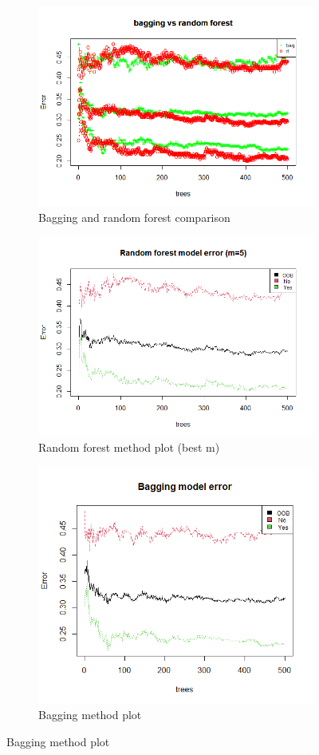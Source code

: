 \begin{figure}[h]
	\centering
	\begin{subfigure}{.6\textwidth}
		\centering
		\includegraphics[width=0.5\linewidth]{ImageFiles/Classification/vs_bagg_for_500_plot}
		\caption{Bagging and random forest comparison}
		\label{fig:vs_bagg_for_500_plot}
	\end{subfigure}
	\begin{subfigure}{.6\textwidth}
		\centering
		\includegraphics[width=0.5\linewidth]{ImageFiles/Classification/best_for_500_plot}
		\caption{Random forest method plot (best m)}
		\label{fig:best_for_500_plot}
	\end{subfigure}%
	\begin{subfigure}{.6\textwidth}
		\centering
		\includegraphics[width=0.5\linewidth]{ImageFiles/Classification/bagg_500_plot}
		\caption{Bagging method plot}
		\label{fig:bagg_500_plot}
	\end{subfigure}
\end{figure}


